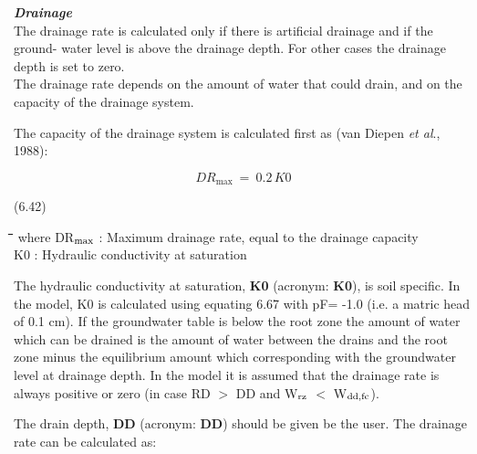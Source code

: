 \documentclass[11pt]{article}
\begin{document}
 

{\bf {\it Drainage\/}}\\
The drainage rate is calculated only if there is artificial drainage and if the ground- water
level is above the drainage depth. For other cases the drainage depth is set to zero.\\
The drainage rate depends on the amount of water that could drain, and on the capacity of
the drainage system.

The capacity of the drainage system is calculated first as (van Diepen {\it et al\/}., 1988):

\begin{displaymath}
DR _{\max } ~=~ 0.2\, K0
\end{displaymath}

 \bigskip
\strut\hfill (6.42)
\nwln
\begin{tabbing}
\hspace{1.27cm}\=\hspace{1.27cm}\=\hspace{1.27cm}\=\hspace{1.27cm}\=%
\hspace{1.27cm}\=\hspace{1.27cm}\=\hspace{1.27cm}\=\hspace{1.27cm}\=%
\hspace{1.27cm}\=\hspace{1.27cm}\=\kill
where\> DR$_{{\rm max}}$\> : Maximum drainage rate, equal to the drainage capacity\> \> \> \> \> \> \> \> [cm d$^{{\rm -1}}$]\\
\>K0\> : Hydraulic conductivity at saturation \> \> \> \> \> \> \> \> [cm d$^{{\rm -1}}$]
\end{tabbing}

\bigskip
The hydraulic conductivity at saturation, {\bf K0}  (acronym: {\bf K0}), is soil specific. In the
model, K0 is calculated using equating 6.67 with pF= -1.0 (i.e. a matric head of 0.1
cm). If the groundwater table is below the root zone the amount of water which can be
drained is the amount of water between the drains and the root zone minus the equilibri\-um amount which corresponding with the groundwater level at drainage depth. In the
model it is assumed that the drainage rate is always positive or zero (in case RD $>$ DD
and W$_{{\rm rz}}$ $<$ W$_{{\rm dd,fc}}$).

\bigskip
\bigskip
\bigskip
The drain depth, {\bf DD} (acronym: {\bf DD}) should be given be the user. The drainage rate can
be calculated as:
\end{document}
